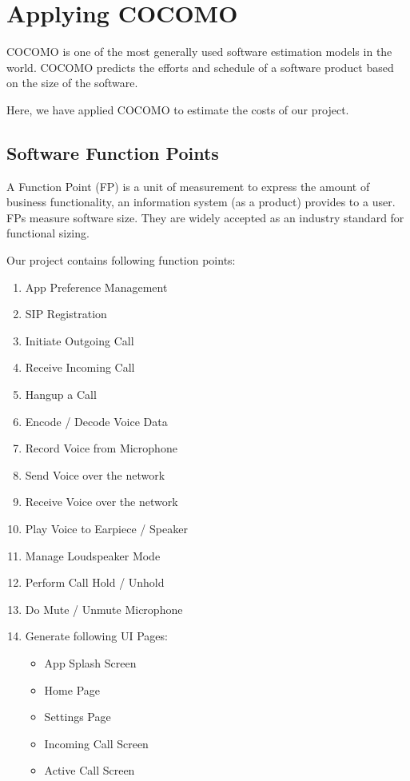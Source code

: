 \chapter{Applying COCOMO}
COCOMO is one of the most generally used software estimation models in the world. COCOMO predicts the efforts and schedule of a software product based on the size of the software.

Here, we have applied COCOMO to estimate the costs of our project.

\section{Software Function Points}
A Function Point (FP) is a unit of measurement to express the amount of business functionality, an information system (as a product) provides to a user. FPs measure software size. They are widely accepted as an industry standard for functional sizing.

Our project contains following function points:

\begin{enumerate}
 \item App Preference Management
 \item SIP Registration
 \item Initiate Outgoing Call
 \item Receive Incoming Call
 \item Hangup a Call
 \item Encode / Decode Voice Data
 \item Record Voice from Microphone
 \item Send Voice over the network
 \item Receive Voice over the network
 \item Play Voice to Earpiece / Speaker
 \item Manage Loudspeaker Mode
 \item Perform Call Hold / Unhold
 \item Do Mute / Unmute Microphone
 \item Generate following UI Pages:
 \begin{itemize}
  \item App Splash Screen
  \item Home Page
  \item Settings Page
  \item Incoming Call Screen
  \item Active Call Screen
 \end{itemize}

\end{enumerate}

